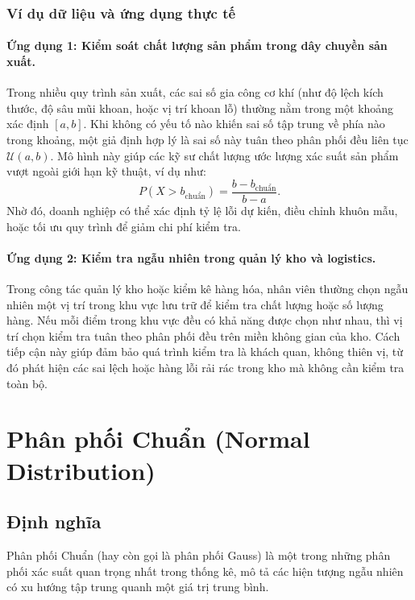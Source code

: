 \subsubsection{Ví dụ dữ liệu và ứng dụng thực tế}

\paragraph{Ứng dụng 1: Kiểm soát chất lượng sản phẩm trong dây chuyền sản xuất.} 
Trong nhiều quy trình sản xuất, các sai số gia công cơ khí (như độ lệch kích thước, độ sâu mũi khoan, hoặc vị trí khoan lỗ) thường nằm trong một khoảng xác định \([a, b]\). Khi không có yếu tố nào khiến sai số tập trung về phía nào trong khoảng, một giả định hợp lý là sai số này tuân theo phân phối đều liên tục \(\mathcal{U}(a, b)\). 
Mô hình này giúp các kỹ sư chất lượng ước lượng xác suất sản phẩm vượt ngoài giới hạn kỹ thuật, ví dụ như:
\[
P(X > b_{\text{chuẩn}}) = \frac{b - b_{\text{chuẩn}}}{b - a}.
\]
Nhờ đó, doanh nghiệp có thể xác định tỷ lệ lỗi dự kiến, điều chỉnh khuôn mẫu, hoặc tối ưu quy trình để giảm chi phí kiểm tra.

\paragraph{Ứng dụng 2: Kiểm tra ngẫu nhiên trong quản lý kho và logistics.} 
Trong công tác quản lý kho hoặc kiểm kê hàng hóa, nhân viên thường chọn ngẫu nhiên một vị trí trong khu vực lưu trữ để kiểm tra chất lượng hoặc số lượng hàng. Nếu mỗi điểm trong khu vực đều có khả năng được chọn như nhau, thì vị trí chọn kiểm tra tuân theo phân phối đều trên miền không gian của kho. 
Cách tiếp cận này giúp đảm bảo quá trình kiểm tra là khách quan, không thiên vị, từ đó phát hiện các sai lệch hoặc hàng lỗi rải rác trong kho mà không cần kiểm tra toàn bộ.

\section{Phân phối Chuẩn (Normal Distribution)}

\subsection{Định nghĩa}

Phân phối Chuẩn (hay còn gọi là phân phối Gauss) là một trong những phân phối xác suất quan trọng nhất trong thống kê, mô tả các hiện tượng ngẫu nhiên có xu hướng tập trung quanh một giá trị trung bình.  

